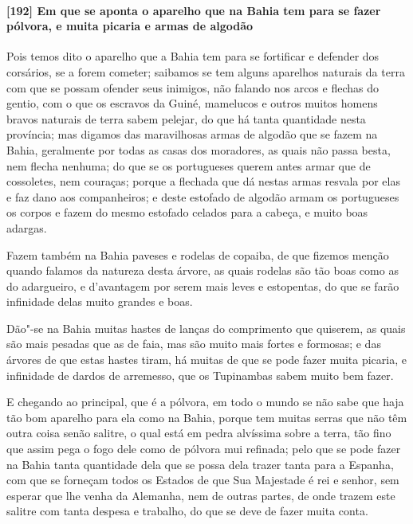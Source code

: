 \begin{linenumbers}
\paragraph{[192] Em que se aponta o aparelho que na Bahia tem para se fazer pólvora, e muita
picaria e armas de algodão}\quad
Pois temos dito o aparelho que a Bahia tem para se fortificar e defender dos corsários, se
a forem cometer; saibamos se tem alguns aparelhos naturais da terra com que se possam
ofender seus inimigos, não falando nos arcos e flechas do gentio, com o que os escravos da
Guiné, mamelucos e outros muitos homens bravos naturais de terra sabem pelejar, do que há
tanta quantidade nesta província; mas digamos das maravilhosas armas de algodão que se
fazem na Bahia, geralmente por todas as casas dos moradores, as quais não passa besta, nem
flecha nenhuma; do que se os portugueses querem antes armar que de cossoletes, nem
couraças; porque a flechada que dá nestas armas resvala por elas e faz dano aos
companheiros; e deste estofado de algodão armam os portugueses os corpos e fazem do mesmo
estofado celados para a cabeça, e muito boas adargas.

Fazem também na Bahia paveses e rodelas de copaiba, de que fizemos menção quando falamos
da natureza desta árvore, as quais rodelas são tão boas como as do adargueiro, e
d'avantagem por serem mais leves e estopentas, do que se farão infinidade delas muito
grandes e boas.

Dão"-se na Bahia muitas hastes de lanças do comprimento que quiserem, as quais são mais
pesadas que as de faia, mas são muito mais fortes e formosas; e das árvores de que estas
hastes tiram, há muitas de que se pode fazer muita picaria, e infinidade de dardos de
arremesso, que os Tupinambas sabem muito bem fazer.

E chegando ao principal, que é a pólvora, em todo o mundo se não sabe que haja tão bom
aparelho para ela como na Bahia, porque tem muitas serras que não têm outra coisa senão
salitre, o qual está em pedra alvíssima sobre a terra, tão fino que assim pega o fogo dele
como de pólvora mui refinada; pelo que se pode fazer na Bahia tanta quantidade dela que se
possa dela trazer tanta para a Espanha, com que se forneçam todos os Estados de que Sua
Majestade é rei e senhor, sem esperar que lhe venha da Alemanha, nem de outras partes, de
onde trazem este salitre com tanta despesa e trabalho, do que se deve de fazer muita
conta.


\end{linenumbers}
